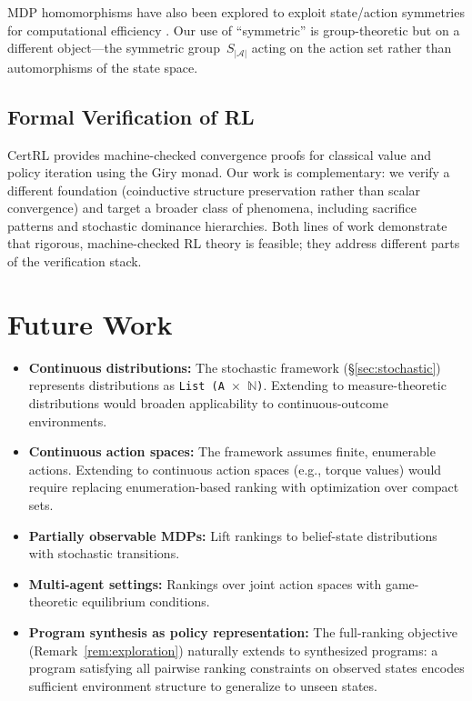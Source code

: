 \documentclass[runningheads]{llncs}
\begin{document}
MDP homomorphisms have also been explored to exploit state/action symmetries for computational efficiency \cite{vanderPol2020}.  Our use of ``symmetric'' is group-theoretic but on a different object---the symmetric group~$S_{|\mathcal{A}|}$ acting on the action set rather than automorphisms of the state space.

\subsection{Formal Verification of RL}

CertRL \cite{Vajjha2021} provides machine-checked convergence proofs for classical value and policy iteration using the Giry monad.  Our work is complementary: we verify a different foundation (coinductive structure preservation rather than scalar convergence) and target a broader class of phenomena, including sacrifice patterns and stochastic dominance hierarchies.  Both lines of work demonstrate that rigorous, machine-checked RL theory is feasible; they address different parts of the verification stack.

\section{Future Work}\label{sec:future}

\begin{itemize}
\item \textbf{Continuous distributions:} The stochastic framework (\S\ref{sec:stochastic}) represents distributions as \texttt{List (A $\times$ $\mathbb{N}$)}.  Extending to measure-theoretic distributions would broaden applicability to continuous-outcome environments.
\item \textbf{Continuous action spaces:} The framework assumes finite, enumerable actions.  Extending to continuous action spaces (e.g., torque values) would require replacing enumeration-based ranking with optimization over compact sets.
\item \textbf{Partially observable MDPs:} Lift rankings to belief-state distributions with stochastic transitions.
\item \textbf{Multi-agent settings:} Rankings over joint action spaces with game-theoretic equilibrium conditions.
\item \textbf{Program synthesis as policy representation:} The full-ranking objective (Remark~\ref{rem:exploration}) naturally extends to synthesized programs: a program satisfying all pairwise ranking constraints on observed states encodes sufficient environment structure to generalize to unseen states.
\end{itemize}
\end{document}

